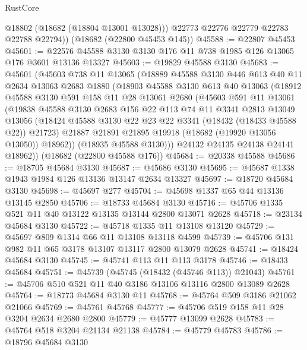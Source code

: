 \begin{lexlean}{RustCore}
\begin{coremodule}
          @18802
          (@18682 (@18804 @13001 @13028)))
        @22773
        @22776
        @22779
        @22783
        @22788
        @22794))
    (@18682 (@22800 @45453 @145))
@45588 := @22807 @45453
@45601 := @22576 @45588 @3130 @3130 @176 @11 @738 @1985 @126 @13065 @176 @3601 @13136 @13327
@45603 := @19829 @45588 @3130
@45683 := @45601
    (@45603
      @738
      @11
      @13065
      (@18889
        @45588
        @3130
        @446
        @613
        @40
        @11
        @2634
        @13063
        @2683
        @1880
        (@18903
          @45588
          @3130
          @613
          @40
          @13063
          (@18912
            @45588
            @3130
            @591
            @158
            @11
            @28
            @13061
            @2680
            (@45603
              @591
              @11
              @13061
              (@19838
                @45588
                @3130
                @2683
                @156
                @22
                @113
                @74
                @11
                @3341
                @2813
                @13049
                @13056
                (@18424 @45588 @3130 @22 @23 @22 @3341 (@18432 (@18433 @45588 @22)) @21723)
                @21887
                @21891
                @21895
                @19918
                (@18682 (@19920 @13056 @13050))
                @18962))
            (@18935 @45588 @3130)))
        @24132
        @24135
        @24138
        @24141
        @18962))
    (@18682 (@22800 @45588 @176))
@45684 := @20338 @45588
@45686 := @18705 @45684 @3130
@45687 := @45686 @3130
@45695 := @45687 @1338 @1943 @1984 @126 @13136 @13147 @2634 @13327
@45697 := @18720 @45684 @3130
@45698 := @45697 @277
@45704 := @45698 @1337 @65 @44 @13136 @13145 @2850
@45706 := @18733 @45684 @3130
@45716 := @45706 @1335 @521 @11 @40 @13122 @13135 @13144 @2800 @13071 @2628
@45718 := @23134 @45684 @3130
@45722 := @45718 @1335 @11 @13108 @13120
@45729 := @45697 @809 @1314 @66 @11 @13108 @13118 @4599
@45739 := @45706 @131 @982 @11 @65 @3178 @13107 @13117 @2800 @13079 @2628
@45741 := @18424 @45684 @3130
@45745 := @45741 @113 @11 @113 @3178
@45746 := @18433 @45684
@45751 := @45739 (@45745 (@18432 (@45746 @113)) @21043)
@45761 := @45706 @510 @521 @11 @40 @3186 @13106 @13116 @2800 @13089 @2628
@45764 := @18773 @45684 @3130 @11
@45768 := @45764 @509 @3186 @21062 @21066
@45769 := @45761 @45768
@45777 := @45706 @519 @158 @11 @28 @3204 @2634 @2680 @2800
@45779 := @45777 @13099 @2628
@45783 := @45764 @518 @3204 @21134 @21138
@45784 := @45779 @45783
@45786 := @18796 @45684 @3130

\end{coremodule}
\end{lexlean}
